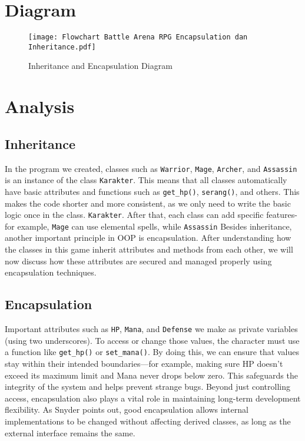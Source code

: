 \documentclass[12pt]{article}
\begin{document}
\newpage

\section{Diagram}

\begin{figure}[H]
    \centering
    \hspace*{-6cm}
    \texttt{[image: Flowchart Battle Arena RPG Encapsulation dan Inheritance.pdf]}
    \caption{Inheritance and Encapsulation Diagram}
    \label{fig:diagram}
\end{figure}

\vspace*{2cm}

\section{Analysis}

\subsection*{Inheritance}
In the program we created, classes such as \texttt{Warrior}, \texttt{Mage}, \texttt{Archer}, and \texttt{Assassin} is an instance of the class \texttt{Karakter}. This means that all classes automatically have basic attributes and functions such as \texttt{get\_hp()}, \texttt{serang()}, and others. This makes the code shorter and more consistent, as we only need to write the basic logic once in the class. \texttt{Karakter}. After that, each class can add specific features-for example, \texttt{Mage} can use elemental spells, while \texttt{Assassin} Besides inheritance, another important principle in OOP is encapsulation. After understanding how the classes in this game inherit attributes and methods from each other, we will now discuss how these attributes are secured and managed properly using encapsulation techniques.

\subsection*{Encapsulation}
Important attributes such as \texttt{HP}, \texttt{Mana}, and \texttt{Defense} we make as private variables (using two underscores). To access or change those values, the character must use a function like \texttt{get\_hp()} or \texttt{set\_mana()}. By doing this, we can ensure that values stay within their intended boundaries—for example, making sure HP doesn't exceed its maximum limit and Mana never drops below zero. This safeguards the integrity of the system and helps prevent strange bugs. Beyond just controlling access, encapsulation also plays a vital role in maintaining long-term development flexibility. As Snyder points out, good encapsulation allows internal implementations to be changed without affecting derived classes, as long as the external interface remains the same.
\end{document}
